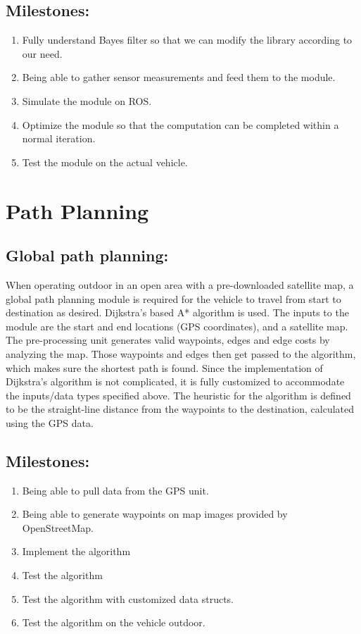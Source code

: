 \documentclass[compsoc,draftclsnofoot,onecolumn,10pt]{IEEEtran}
\begin{document}
\subsection{Milestones:}
\begin{enumerate}
	\item Fully understand Bayes filter so that we can modify the library according to our need.
	\item Being able to gather sensor measurements and feed them to the module.
	\item Simulate the module on ROS.
	\item Optimize the module so that the computation can be completed within a normal iteration.
	\item Test the module on the actual vehicle.
\end{enumerate}

\section{Path Planning}
\subsection{Global path planning:}
When operating outdoor in an open area with a pre-downloaded satellite map, a global path planning module is required for the vehicle to travel from start to destination as desired. Dijkstra's based A* algorithm is used. The inputs to the module are the start and end locations (GPS coordinates), and a satellite map. The pre-processing unit generates valid waypoints, edges and edge costs by analyzing the map. Those waypoints and edges then get passed to the algorithm, which makes sure the shortest path is found. Since the implementation of Dijkstra’s algorithm is not complicated, it is fully customized to accommodate the inputs/data types specified above. The heuristic for the algorithm is defined to be the straight-line distance from the waypoints to the destination, calculated using the GPS data.\par
\subsection{Milestones:}
\begin{enumerate}
	\item Being able to pull data from the GPS unit.
	\item Being able to generate waypoints on map images provided by OpenStreetMap.
	\item Implement the algorithm
	\item Test the algorithm
	\item Test the algorithm with customized data structs.
	\item Test the algorithm on the vehicle outdoor.
\end{enumerate}
\end{document}
